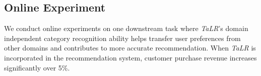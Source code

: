 \subsection{Online Experiment}
We conduct online experiments on one downstream task where \textit{TaLR}'s domain independent category recognition ability helps transfer user preferences from other domains and contributes to more accurate recommendation. When \textit{TaLR} is incorporated in the recommendation system, customer purchase revenue increases significantly over 5\%.
